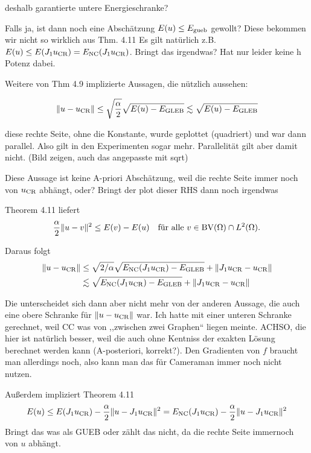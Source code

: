       deshalb garantierte untere Energieschranke?

      Falls ja, ist dann noch eine Abschätzung $E(u)\leq E_\textup{gueb}$ gewollt?
      Diese bekommen wir nicht so wirklich aus Thm. 4.11
      Es gilt natürlich z.B.
      $E(u)\leq E(J_1u_\textup{CR})=E_\textup{NC}(J_1u_\textup{CR})$. Bringt das irgendwas? Hat nur
      leider keine h Potenz dabei.

      Weitere von Thm 4.9 implizierte Aussagen, die nützlich aussehen:

      \begin{align*}
        \Vert u-u_\textup{CR}\Vert\leq 
        \sqrt{\frac{\alpha}{2}}\sqrt{E(u)-E_\textup{GLEB}}
        \lesssim
        \sqrt{E(u)-E_\textup{GLEB}}
      \end{align*}

      diese rechte Seite, ohne die Konstante, wurde geplottet (quadriert)
      und war dann parallel. Also gilt in den Experimenten sogar mehr. 
      Parallelität gilt aber damit nicht. (Bild zeigen, auch das angepasste
      mit sqrt)

      Diese Aussage ist keine A-priori Abschätzung, weil die rechte
      Seite immer noch von $u_\textup{CR}$ abhängt, oder?
      Bringt der plot dieser RHS dann noch irgendwas
      

      Theorem 4.11 liefert
  \begin{align*}
    \frac{\alpha}{2}\Vert u-v\Vert^2 \leq E(v)-E(u)\quad
    \text{für alle } v\in\textup{BV}(\Omega)\cap L^2(\Omega).
  \end{align*}

  Daraus folgt
  \begin{align*}
    \Vert u-u_\textup{CR}\Vert &\leq
    \sqrt{2/\alpha}\sqrt{E_\textup{NC}(J_1{u_\textup{CR}})-E_\textup{GLEB}} + \Vert J_1u_\textup{CR}-u_\textup{CR}\Vert\\
    &\lesssim
    \sqrt{E_\textup{NC}(J_1{u_\textup{CR}})-E_\textup{GLEB}} + \Vert J_1u_\textup{CR}-u_\textup{CR}\Vert
  \end{align*}

  Die unterscheidet sich dann aber nicht mehr von der anderen Aussage, die auch 
  eine obere Schranke für $\Vert u-u_\textup{CR}\Vert$ war.
  Ich hatte mit einer unteren Schranke gerechnet, weil CC was von ,,zwischen
  zwei Graphen`` liegen meinte.
  ACHSO, die hier ist natürlich besser, weil die auch ohne Kentniss der exakten
  Lösung berechnet werden kann (A-posteriori, korrekt?). Den Gradienten von $f$
  braucht man allerdings noch, also kann man das für Cameraman immer noch nicht
  nutzen.

  Außerdem impliziert Theorem 4.11
  \begin{align*}
    E(u)\leq E(J_1 u_\textup{CR})-\frac{\alpha}{2}\Vert u - J_1 u_\textup{CR}\Vert^2 
    = E_\textup{NC}(J_1 u_\textup{CR})-\frac{\alpha}{2}\Vert u - J_1 u_\textup{CR}\Vert^2 
  \end{align*}
  Bringt das was als GUEB oder zählt das nicht, da die rechte Seite immernoch von
  $u$ abhängt.

